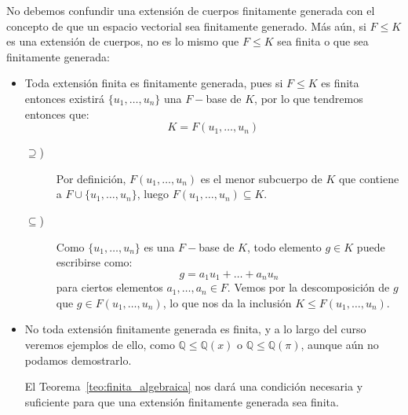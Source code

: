 \begin{observacion}
    No debemos confundir una extensión de cuerpos finitamente generada con el concepto de que un espacio vectorial sea finitamente generado. Más aún, si $F\leq K$ es una extensión de cuerpos, no es lo mismo que $F\leq K$ sea finita o que sea finitamente generada:
    \begin{itemize}
        \item Toda extensión finita es finitamente generada, pues si $F\leq K$ es finita entonces existirá $\{u_1,\ldots,u_n\}$ una $F-$base de $K$, por lo que tendremos entonces que:
            \begin{equation*}
                K = F(u_1,\ldots,u_n)
            \end{equation*}
            \begin{description}
                \item [$\supseteq$)] Por definición, $F(u_1,\ldots,u_n)$ es el menor subcuerpo de $K$ que contiene a $F\cup \{u_1,\ldots,u_n\}$, luego $F(u_1,\ldots,u_n)\subseteq K$.
                \item [$\subseteq$)] Como $\{u_1,\ldots,u_n\}$ es una $F-$base de $K$, todo elemento $g\in K$ puede escribirse como:
                    \begin{equation*}
                        g = a_1 u_1 + \ldots + a_n u_n
                    \end{equation*}
                    para ciertos elementos $a_1,\ldots,a_n\in F$. Vemos por la descomposición de $g$ que $g\in F(u_1,\ldots,u_n)$, lo que nos da la inclusión $K\leq F(u_1,\ldots,u_n)$.
            \end{description}
        \item No toda extensión finitamente generada es finita, y a lo largo del curso veremos ejemplos de ello, como $\mathbb{Q}\leq \mathbb{Q}(x)$ o $\mathbb{Q}\leq \mathbb{Q}(\pi)$, aunque aún no podamos demostrarlo.
        
        El Teorema~\ref{teo:finita_algebraica} nos dará una condición necesaria y suficiente para que una extensión finitamente generada sea finita.
    \end{itemize}
\end{observacion}

